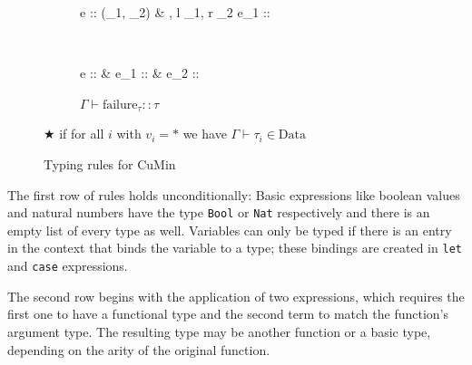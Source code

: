 \documentclass[paper = a4, fleqn, abstract=on, twoside]{scrreprt}
\begin{document}
\begin{figure}[H]
\begin{scriptsize}
\begin{center}
\begin{subfigure}[t]{.5 \linewidth}
			\end{subfigure}
			\hspace{.02 \linewidth}
			\begin{subfigure}[t]{.5 \linewidth}
				\centering
				{\Gamma \vdash e :: (\tau_{1}, \tau_{2}) & \Gamma, l \mapsto \tau_{1}, r \mapsto \tau_{2} \vdash e_{1} :: \tau}
			\end{subfigure}\\
			\vspace{1em}
			\begin{subfigure}[t]{.33 \linewidth}
				\centering
				{\Gamma \vdash e :: \:  & \Gamma \vdash e_{1} :: \tau & \Gamma \vdash e_{2} :: \tau}
			\end{subfigure}
			\begin{subfigure}[t]{.25 \linewidth}
				\centering
				$\Gamma \vdash \text{failure}_{\tau} :: \tau$
			\end{subfigure}
			\begin{subfigure}[t]{.33 \linewidth}
				\centering
			     	  {\Gamma \vdash \tau \in {}}
			\end{subfigure}
		\end{center}
			\begin{flushright}
				$\bigstar$ if for all $i$ with $v_{i} = *$ we have $\Gamma \vdash \tau_{i} \in \text{Data}$
			\end{flushright}
	\end{scriptsize}
	\vspace*{-1em}
	\caption{Typing rules for CuMin}
\end{figure}\noindent
The first row of rules holds unconditionally: Basic expressions like boolean values and natural numbers have the type \texttt{Bool} or \texttt{Nat} respectively and there is an empty list of every type as well. Variables can only be typed if there is an entry in the context that binds the variable to a type; these bindings are created in \texttt{let} and \texttt{case} expressions.
\par
The second row begins with the application of two expressions, which requires the first one to have a functional type and the second term to match the function's argument type. The resulting type may be another function or a basic type, depending on the arity of the original function.
\end{document}
